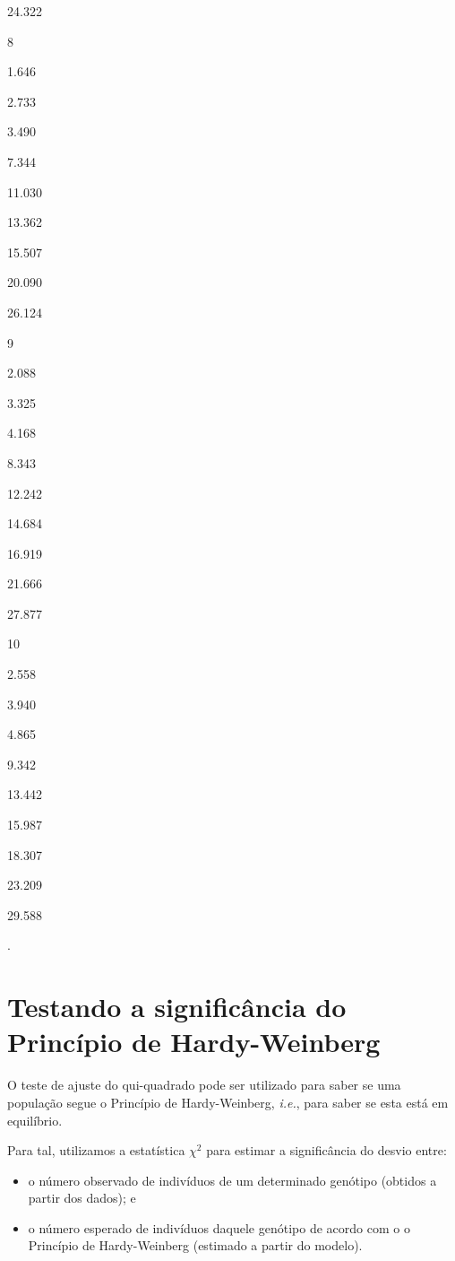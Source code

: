\documentclass[
]{book}
\begin{document}
24.322

8

1.646

2.733

3.490

7.344

11.030

13.362

15.507

20.090

26.124

9

2.088

3.325

4.168

8.343

12.242

14.684

16.919

21.666

27.877

10

2.558

3.940

4.865

9.342

13.442

15.987

18.307

23.209

29.588

.\linebreak

\hypertarget{testando-a-significuxe2ncia-do-princuxedpio-de-hardy-weinberg}{%
\section{Testando a significância do Princípio de Hardy-Weinberg}\label{testando-a-significuxe2ncia-do-princuxedpio-de-hardy-weinberg}}

O teste de ajuste do qui-quadrado pode ser utilizado para saber se uma população segue o Princípio de Hardy-Weinberg, \emph{i.e.}, para saber se esta está em equilíbrio.

Para tal, utilizamos a estatística \(\chi^2\) para estimar a significância do desvio entre:

\begin{itemize}
\item
  o número observado de indivíduos de um determinado genótipo (obtidos a partir dos dados); e
\item
  o número esperado de indivíduos daquele genótipo de acordo com o o Princípio de Hardy-Weinberg (estimado a partir do modelo).
\end{itemize}
\end{document}
